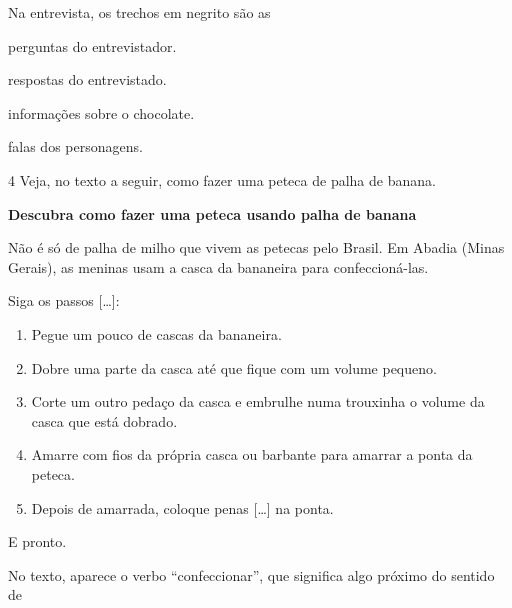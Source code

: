 \pagebreak
Na entrevista, os trechos em negrito são as

\begin{escolha}
\item perguntas do entrevistador.

\item respostas do entrevistado.

\item informações sobre o chocolate.

\item falas dos personagens.
\end{escolha}



\num{4} Veja, no texto a seguir, como fazer uma peteca de palha de banana.

\begin{myquote}
\textbf{Descubra como fazer uma peteca usando palha de banana}

Não é só de palha de milho que vivem as petecas pelo Brasil. Em Abadia
(Minas Gerais), as meninas usam a casca da bananeira para
confeccioná-las.

Siga os passos {[}\ldots{}{]}:

\begin{enumerate}
\item Pegue um pouco de cascas da bananeira.

\item Dobre uma parte da casca até que fique com um volume pequeno.

\item Corte um outro pedaço da casca e embrulhe numa trouxinha o volume da
casca que está dobrado.

\item Amarre com fios da própria casca ou barbante para amarrar a ponta da
peteca.

\item Depois de amarrada, coloque penas {[}\ldots{}{]} na ponta.
\end{enumerate}

E pronto.

\end{myquote}

No texto, aparece o verbo ``confeccionar'', que significa algo próximo do sentido de

